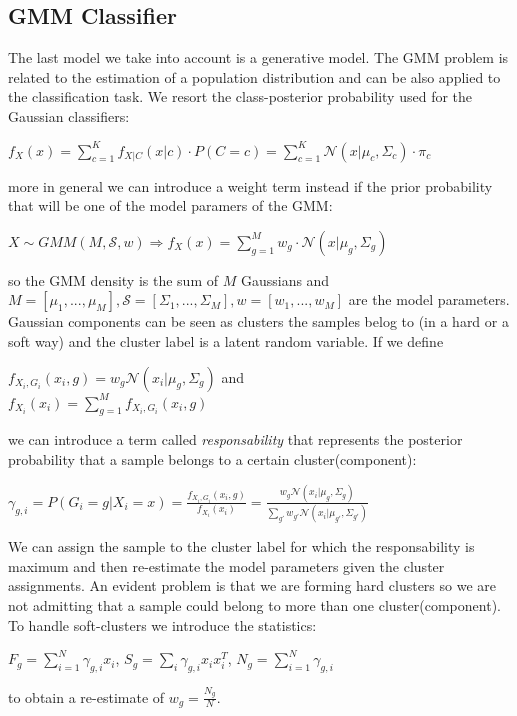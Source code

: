 \documentclass[10pt, a4paper, twocolumn]{article} %
\begin{document}
\subsection{GMM Classifier}
The last model we take into account is a generative model. 
The GMM problem is related to the estimation of a population distribution and can be 
also applied to the classification task. We resort the class-posterior probability
used for the Gaussian classifiers:
\begin{center}
	$f_X(x) = \sum_{c=1}^K f_{X|C}(x|c) \cdot P(C=c) = \sum_{c=1}^K \mathcal{N}(x|\mu_c,\Sigma_c) \cdot \pi_c$
\end{center}
more in general we can introduce a weight term instead if the prior probability that will
be one of the model paramers of the GMM:
\begin{center}
	$X \sim GMM(M,\mathcal{S},w) \Rightarrow f_X(x) = \sum_{g=1}^M w_g \cdot \mathcal{N}(x|\mu_g,\Sigma_g)$
\end{center}
so the GMM density is the sum of $M$ Gaussians and 
$M=[\mu_1,...,\mu_M], \mathcal{S}=[\Sigma_1,...,\Sigma_M], w=[w_1,...,w_M]$ are the
model parameters. Gaussian components can be seen as clusters the samples belog to (in
a hard or a soft way) and the cluster label is a latent random variable. If we define
\begin{center}
	$f_{X_i,G_i}(x_i,g)=w_g\mathcal{N}(x_i|\mu_g,\Sigma_g)$ and \\
	$f_{X_i}(x_i) = \sum_{g=1}^M f_{X_i,G_i}(x_i,g)$
\end{center}
we can introduce a term called \textit{responsability} that represents the posterior probability
that a sample belongs to a certain cluster(component):
\begin{center}
	$\gamma_{g,i} = P(G_i = g|X_i=x) = \frac{f_{X_i,G_i}(x_i,g)}{f_{X_i}(x_i)} = \frac{w_g\mathcal{N}(x_i|\mu_g,\Sigma_g)}{\sum_{g'} w_{g'}\mathcal{N}(x_i|\mu_{g'},\Sigma_{g'})}$
\end{center}
We can assign the sample to the cluster label for which the responsability is maximum and 
then re-estimate the model parameters given the cluster assignments. An evident
problem is that we are forming hard clusters so we are not admitting that a sample could
belong to more than one cluster(component). To handle soft-clusters we introduce the statistics:
\begin{center}
		$F_g=\sum_{i=1}^N \gamma_{g,i}x_i$, \;$S_g=\sum_{i}\gamma_{g,i}x_ix_i^T$, \;$N_g=\sum_{i=1}^N \gamma_{g,i}$
\end{center}
to obtain a re-estimate of $w_g = \frac{N_g}{N}$.
\end{document}
